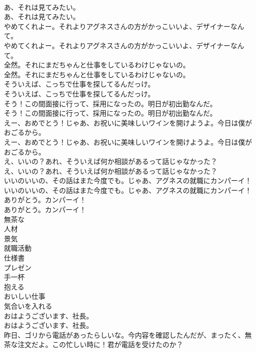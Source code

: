 \documentclass[8pt]{extreport}
\begin{document}
\begin{CJK}{UTF8}{min}
\\	あ、それは見てみたい。	
\\	あ、それは見てみたい。 
\\	やめてくれよー。それよりアグネスさんの方がかっこいいよ、デザイナーなんて。	
\\	やめてくれよー。それよりアグネスさんの方がかっこいいよ、デザイナーなんて。 
\\	全然。それにまだちゃんと仕事をしているわけじゃないの。	
\\	全然。それにまだちゃんと仕事をしているわけじゃないの。 
\\	そういえば、こっちで仕事を探してるんだっけ。	
\\	そういえば、こっちで仕事を探してるんだっけ。 
\\	そう！この間面接に行って、採用になったの。明日が初出勤なんだ。	
\\	そう！この間面接に行って、採用になったの。明日が初出勤なんだ。 
\\	えー、おめでとう！じゃあ、お祝いに美味しいワインを開けようよ。今日は僕がおごるから。	
\\	えー、おめでとう！じゃあ、お祝いに美味しいワインを開けようよ。今日は僕がおごるから。 
\\	え、いいの？あれ、そういえば何か相談があるって話じゃなかった？	
\\	え、いいの？あれ、そういえば何か相談があるって話じゃなかった？ 
\\	いいのいいの、その話はまた今度でも。じゃあ、アグネスの就職にカンパーイ！	
\\	いいのいいの、その話はまた今度でも。じゃあ、アグネスの就職にカンパーイ！ 
\\	ありがとう。カンパーイ！	
\\	ありがとう。カンパーイ！ 
\\	無茶な
\\	人材
\\	景気
\\	就職活動
\\	仕様書
\\	プレゼン
\\	手一杯
\\	抱える
\\	おいしい仕事
\\	気合いを入れる
\\	おはようございます、社長。	
\\	おはようございます、社長。 
\\	昨日、ゴリから電話があったらしいな。今内容を確認したんだが、まったく、無茶な注文だよ。この忙しい時に！君が電話を受けたのか？	

\end{CJK}
\end{document}

